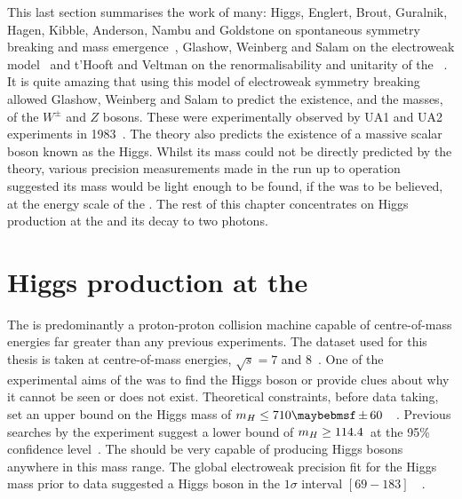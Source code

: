 This last section summarises the work of many: Higgs, Englert, Brout, Guralnik, Hagen, Kibble, Anderson, Nambu and Goldstone on spontaneous symmetry breaking and mass emergence~\cite{englert-brout,HagenKibble,Higgs:1964ia,Higgs,Nambu,Goldstone,Anderson}, Glashow, Weinberg and Salam on the electroweak model~\cite{Glashow,Weinberg,Salam} and t'Hooft and Veltman on the renormalisability and unitarity of the \SM~\cite{tHooft:1972fi,Hooft1971167}. It is quite amazing that using this model of electroweak symmetry breaking allowed Glashow, Weinberg and Salam to predict the existence, and the masses, of the $W^{\pm}$ and $Z$ bosons. These were experimentally observed by UA1 and UA2 experiments in 1983~\cite{ua1,ua2}. The theory also predicts the existence of a massive scalar boson known as the Higgs. Whilst its mass could not be directly predicted by the theory, various precision measurements made in the run up to \LHC operation suggested its mass would be light enough to be found, if the \SM was to be believed, at the energy scale of the \LHC. The rest of this chapter concentrates on Higgs production at the \LHC and its decay to two photons. 

\section{Higgs production at the \LHC}

The \LHC is predominantly a proton-proton collision machine capable of centre-of-mass energies far greater than any previous experiments. The dataset used for this thesis is taken at centre-of-mass energies, $\sqrt{s}=7$ and 8~\TeV. One of the experimental aims of the \LHC was to find the Higgs boson or provide clues about why it cannot be seen or does not exist. Theoretical constraints, before \LHC data taking, set an upper bound on the \SM Higgs mass of $\mH\leq710\pm60$~\GeV~\cite{upper-higgs-bound}. Previous searches by the \LEP experiment suggest a lower bound of $m_{H}\geq114.4$~\GeV at the 95\% confidence level~\cite{lep-higgs}. The \LHC should be very capable of producing \SM Higgs bosons anywhere in this mass range. The global electroweak precision fit for the Higgs mass prior to \LHC data suggested a \SM Higgs boson in the $1\sigma$ interval $[69-183]$~\GeV~\cite{ewfits}.

